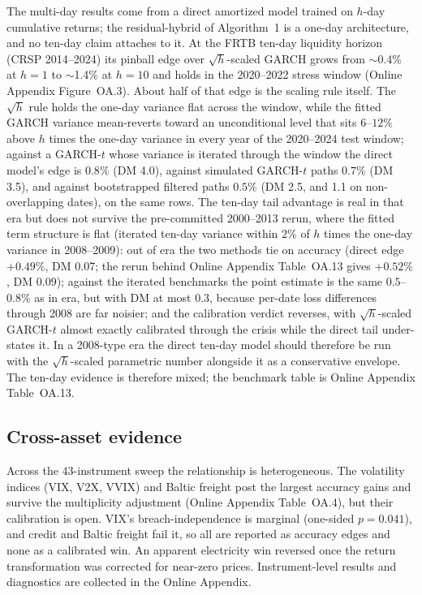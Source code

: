 \documentclass[11pt]{article}
\theoremstyle{remark}
\begin{document}
The multi-day results come from a direct amortized model trained on
$h$-day cumulative returns; the residual-hybrid of Algorithm~1 is a
one-day architecture, and no ten-day claim attaches to it. At the FRTB
ten-day liquidity horizon (CRSP 2014--2024) its pinball edge over
$\sqrt{h}$-scaled GARCH grows from $\sim$0.4\% at $h=1$ to $\sim$1.4\% at
$h=10$ and holds in the 2020--2022 stress window (Online Appendix
Figure~OA.3). About half of that edge is the scaling rule itself. The
$\sqrt{h}$ rule holds the one-day variance flat across the window, while
the fitted GARCH variance mean-reverts toward an unconditional level that
sits $6$--$12\%$ above $h$ times the one-day variance in every year of
the 2020--2024 test window; against a GARCH-$t$ whose variance is
iterated through the window the direct model's edge is $0.8\%$ (DM 4.0),
against simulated GARCH-$t$ paths $0.7\%$ (DM 3.5), and against
bootstrapped filtered paths $0.5\%$ (DM 2.5, and 1.1 on non-overlapping dates), on the same rows. The
ten-day tail advantage is real in that era but does not survive the
pre-committed 2000--2013 rerun, where the fitted term structure is flat
(iterated ten-day variance within $2\%$ of $h$ times the one-day
variance in 2008--2009): out of era the two methods tie on accuracy
(direct edge $+0.49\%$, DM 0.07; the rerun behind Online Appendix Table~OA.13 gives $+0.52\%$, DM 0.09); against the iterated benchmarks the
point estimate is the same $0.5$--$0.8\%$ as in era, but with DM at most
0.3, because per-date loss differences through 2008 are far noisier; and the calibration
verdict reverses, with $\sqrt{h}$-scaled GARCH-$t$ almost exactly
calibrated through the crisis while the direct tail under-states it. In a
2008-type era the direct ten-day model should therefore be run with the
$\sqrt{h}$-scaled parametric number alongside it as a conservative
envelope. The ten-day evidence is therefore mixed; the benchmark
table is Online Appendix Table~OA.13.

\subsection{Cross-asset evidence}

Across the 43-instrument sweep the relationship is heterogeneous. The volatility indices (VIX, V2X, VVIX) and Baltic freight post the largest accuracy gains and survive the multiplicity adjustment (Online Appendix Table~OA.4), but their calibration is open. VIX's breach-independence is marginal (one-sided $p=0.041$), and credit and Baltic freight fail it, so all are reported as accuracy edges and none as a calibrated win. An apparent electricity win reversed once the return transformation was corrected for near-zero prices. Instrument-level results and diagnostics are
collected in the Online Appendix.
\end{document}
